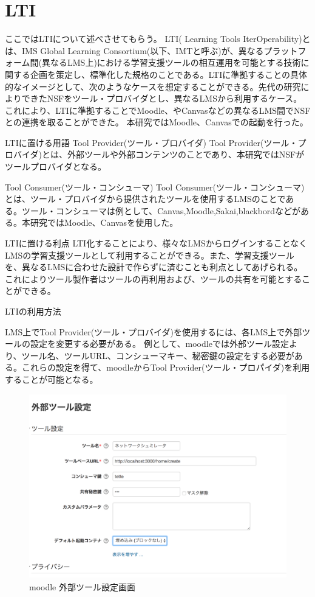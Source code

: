 \section{LTI}
\label{tag:LTI}


ここではLTIについて述べさせてもらう。
LTI(
Learning Tools IterOperability)とは、IMS Global Learning Consortium(以下、IMTと呼ぶ)が、異なるプラットフォーム間(異なるLMS上)における学習支援ツールの相互運用を可能とする技術に関する企画を策定し、標準化した規格のことである。LTIに準拠することの具体的なイメージとして、次のようなケースを想定することができる。先代の研究によりできたNSFをツール・プロバイダとし、異なるLMSから利用するケース。
これにより、LTIに準拠することでMoodle、やCanvasなどの異なるLMS間でNSFとの連携を取ることができた。
本研究ではMoodle、Canvasでの起動を行った。

LTIに置ける用語
Tool Provider(ツール・プロバイダ)
Tool Provider(ツール・プロバイダ)とは、外部ツールや外部コンテンツのことであり、本研究ではNSFがツールプロバイダとなる。

Tool Consumer(ツール・コンシューマ)
Tool Consumer(ツール・コンシューマ)とは、ツール・プロバイダから提供されたツールを使用するLMSのことである。ツール・コンシューマは例として、Canvas,Moodle,Sakai,blackbordなどがある。本研究ではMoodle、Canvasを使用した。

LTIに置ける利点
LTI化することにより、様々なLMSからログインすることなくLMSの学習支援ツールとして利用することができる。また、学習支援ツールを、異なるLMSに合わせた設計で作らずに済むことも利点としてあげられる。これによりツール製作者はツールの再利用および、ツールの共有を可能とすることができる。

LTIの利用方法

LMS上でTool Provider(ツール・プロバイダ)を使用するには、各LMS上で外部ツールの設定を変更する必要がある。
例として、moodleでは外部ツール設定より、ツール名、ツールURL、コンシューマキー、秘密鍵の設定をする必要がある。これらの設定を得て、moodleからTool Provider(ツール・プロパイダ)を利用することが可能となる。

\begin{figure}[htbp]
  \begin{center}
    \includegraphics[clip,width=12.0cm,height=8.0cm]{img/外部ツール設定.png}
    \caption{moodle 外部ツール設定画面}
    \label{fig:moodle config}
  \end{center}
\end{figure}






